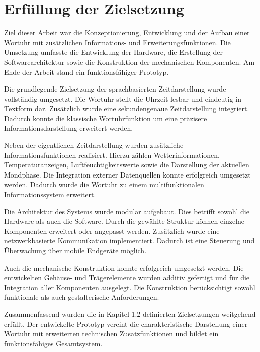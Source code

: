 \section{Erfüllung der Zielsetzung} 
Ziel dieser Arbeit war die Konzeptionierung, Entwicklung und der Aufbau einer Wortuhr mit zusätzlichen Informations- und Erweiterungsfunktionen. 
Die Umsetzung umfasste die Entwicklung der Hardware, die Erstellung der Softwarearchitektur sowie die Konstruktion der mechanischen Komponenten. 
Am Ende der Arbeit stand ein funktionsfähiger Prototyp.

Die grundlegende Zielsetzung der sprachbasierten Zeitdarstellung wurde vollständig umgesetzt. 
Die Wortuhr stellt die Uhrzeit lesbar und eindeutig in Textform dar. 
Zusätzlich wurde eine sekundengenaue Zeitdarstellung integriert.
 Dadurch konnte die klassische Wortuhrfunktion um eine präzisere Informationsdarstellung erweitert werden.

Neben der eigentlichen Zeitdarstellung wurden zusätzliche Informationsfunktionen realisiert. 
Hierzu zählen Wetterinformationen, Temperaturanzeigen, Luftfeuchtigkeitswerte sowie die Darstellung der aktuellen Mondphase. 
Die Integration externer Datenquellen konnte erfolgreich umgesetzt werden. 
Dadurch wurde die Wortuhr zu einem multifunktionalen Informationssystem erweitert.

Die Architektur des Systems wurde modular aufgebaut. Dies betrifft sowohl die Hardware als auch die Software. 
Durch die gewählte Struktur können einzelne Komponenten erweitert oder angepasst werden. 
Zusätzlich wurde eine netzwerkbasierte Kommunikation implementiert. 
Dadurch ist eine Steuerung und Überwachung über mobile Endgeräte möglich.

Auch die mechanische Konstruktion konnte erfolgreich umgesetzt werden. 
Die entwickelten Gehäuse- und Trägerelemente wurden additiv gefertigt und für die Integration aller Komponenten ausgelegt. 
Die Konstruktion berücksichtigt sowohl funktionale als auch gestalterische Anforderungen.

Zusammenfassend wurden die in Kapitel 1.2 definierten Zielsetzungen weitgehend erfüllt. 
Der entwickelte Prototyp vereint die charakteristische Darstellung einer Wortuhr mit erweiterten technischen Zusatzfunktionen und bildet ein funktionsfähiges Gesamtsystem.